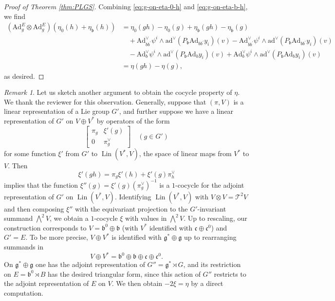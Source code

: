 \documentclass[a4paper,11pt]{amsart}
\newcommand{\s}[1]{\mathcal{#1}}
\newcommand{\fr}[1]{\mathfrak{#1}}
\newcommand{\ox}{\otimes}
\newcommand{\pr}{\prime}
\newcommand{\Ad}{\mathrm{Ad}}
\newcommand{\ad}{\mathrm{ad}}
\newcommand{\medwedge}{{\textstyle\bigwedge}}
\DeclareMathOperator{\Lin}{Lin}
\theoremstyle{definition}
\theoremstyle{remark}
\newtheorem{rmk}[thm]{Remark}
\begin{document}
\begin{proof}[Proof of Theorem \ref{thm:PLGS}]
Combining \eqref{eq:g-on-eta-0-h} and \eqref{eq:g-on-eta-b-h}, we find
\[
\begin{split}
\left( \Ad^{E}_g \ox \Ad^{E}_g \right) \left( \eta_0(h) + \eta_{\fr{b}}(h) \right) &= \eta_0(g h) - \eta_0(g) + \eta_{\fr{b}}(g h) - \eta_{\fr{b}}(g)\\
&\quad  + \Ad^\vee_{b b^\pr} \psi^i \wedge \ad^\vee ( P_{\fr{b}} \Ad_{b b^\pr} y_i ) (v)- \Ad^\vee_{b b^\pr} \psi^i \wedge \ad^\vee ( P_{\fr{b}} \Ad_{b b^\pr} y_i ) (v) \\
&\quad- \Ad^\vee_b \psi^i \wedge \ad^\vee ( P_{\fr{b}} \Ad_b y_i ) (v) + \Ad^\vee_b \psi^i \wedge \ad^\vee ( P_{\fr{b}} \Ad_b y_i ) (v) \\
&= \eta(g h) - \eta(g) ,
\end{split}
\]
as desired.
\end{proof}

\begin{rmk}
Let us sketch another argument to obtain the cocycle property of $\eta$.
We thank the reviewer for this observation.
Generally, suppose that $(\pi, V)$ is a linear representation of a Lie group $G'$, and further suppose we have a linear representation of $G'$ on $V \oplus V^*$ by operators of the form
\[
\begin{bmatrix}
 \pi_g & \xi'(g)\\
 0 & \pi^\vee_g
\end{bmatrix} \quad (g \in G')
\]
for some function $\xi'$ from $G'$ to $\Lin(V^*, V)$, the space of linear maps from $V^*$ to $V$.
Then
\[
\xi'(g h) = \pi_g \xi'(h) + \xi'(g) \pi^\vee_h
\]
implies that the function $\xi''(g) = \xi'(g) (\pi^{\vee}_g)^{-1}$ is a $1$-cocycle for the adjoint representation of $G'$ on $\Lin(V^*, V)$.
Identifying $\Lin(V^*, V)$ with $V \otimes V = \s T^2 V$ and then composing $\xi''$ with the equivariant projection to the $G'$-invariant summand $\medwedge^2 V$, we obtain a $1$-cocycle $\xi$ with values in $\medwedge^2 V$.
Up to rescaling, our construction corresponds to $V = \fr{b}^0 \oplus \fr{b}$ (with $V^*$ identified with $\fr{c} \oplus \fr{c}^0$) and $G' = E$.
To be more precise, $V \oplus V^*$ is identified with $\fr{g}^* \oplus \fr{g}$ up to rearranging summands in
\[
V \oplus V^* = \fr{b}^0 \oplus \fr{b} \oplus \fr{c} \oplus \fr{c}^0.
\]
On $\fr{g}^* \oplus \fr{g}$ one has the adjoint representation of $G'' = \fr{g}^* \rtimes G$, and its restriction on $E = \fr{b}^0 \rtimes B$ has the desired triangular form, since this action of $G''$ restricts to the adjoint representation of $E$ on $V$.
We then obtain $-2 \xi = \eta$ by a direct computation.
\end{rmk}
\end{document}
